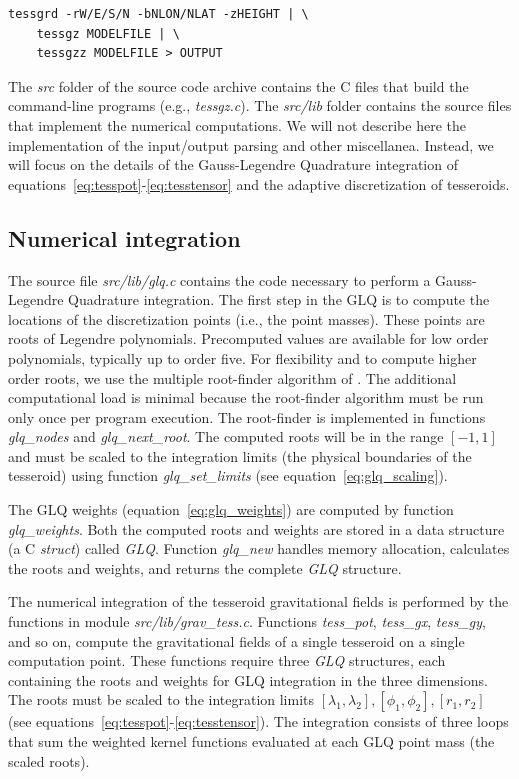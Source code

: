 \documentclass[manuscript,endfloat]{geophysics}
\begin{document}
\begin{verbatim}
tessgrd -rW/E/S/N -bNLON/NLAT -zHEIGHT | \
    tessgz MODELFILE | \
    tessgzz MODELFILE > OUTPUT
\end{verbatim}

The \emph{src} folder of the source code archive
contains the C files that build the command-line programs
(e.g., \emph{tessgz.c}).
The \emph{src/lib} folder contains
the source files that implement the numerical computations.
We will not describe here the implementation of the input/output parsing and
other miscellanea.
Instead, we will focus on the details of the Gauss-Legendre Quadrature
integration of equations~\ref{eq:tesspot}-\ref{eq:tesstensor}
and the adaptive discretization of tesseroids.



\subsection{Numerical integration}

The source file \emph{src/lib/glq.c}
contains the code necessary to perform
a Gauss-Legendre Quadrature integration.
The first step in the GLQ is to compute the
locations of the discretization points (i.e., the point masses).
These points are roots of Legendre polynomials.
Precomputed values are available for low order polynomials,
typically up to order five.
For flexibility and to compute higher order roots,
we use the multiple root-finder algorithm of
\citet{Barrera-Figueroa2006}.
The additional computational load is minimal
because the root-finder algorithm
must be run only once per program execution.
The root-finder is implemented in functions
\emph{glq\_nodes} and \emph{glq\_next\_root}.
The computed roots will be in the range $[-1, 1]$
and must be scaled to the integration limits
(the physical boundaries of the tesseroid)
using function \emph{glq\_set\_limits} (see equation~\ref{eq:glq_scaling}).

The GLQ weights (equation~\ref{eq:glq_weights})
are computed by function \emph{glq\_weights}.
Both the computed roots and weights are stored in a data structure
(a C \emph{struct}) called \emph{GLQ}.
Function \emph{glq\_new}
handles memory allocation,
calculates the roots and weights,
and returns the complete \emph{GLQ} structure.

The numerical integration of the tesseroid gravitational fields
is performed by the functions in module \emph{src/lib/grav\_tess.c}.
Functions \emph{tess\_pot}, \emph{tess\_gx}, \emph{tess\_gy}, and so on,
compute the gravitational fields of a single tesseroid
on a single computation point.
These functions require three \emph{GLQ} structures,
each containing the roots and weights
for GLQ integration in the three dimensions.
The roots must be scaled to the
integration limits
$[\lambda_1, \lambda_2], [\phi_1, \phi_2], [r_1, r_2]$
(see equations~\ref{eq:tesspot}-\ref{eq:tesstensor}).
The integration consists of three loops
that sum the weighted kernel functions
evaluated at each GLQ point mass (the scaled roots).
\end{document}
